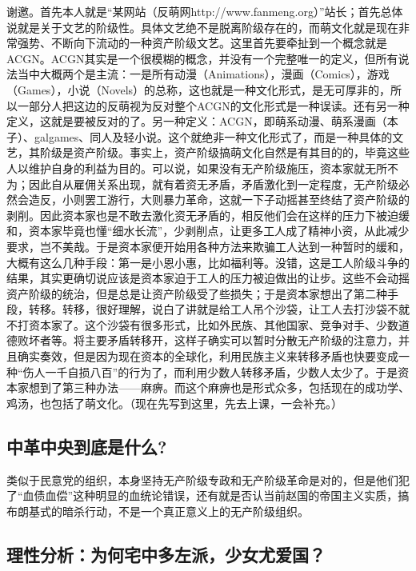 \documentclass{ctexart}
\begin{document}
	谢邀。首先本人就是“某网站（反萌网http://www.fanmeng.org）”站长；首先总体说就是关于文艺的阶级性。具体文艺绝不是脱离阶级存在的，而萌文化就是现在非常强势、不断向下流动的一种资产阶级文艺。这里首先要牵扯到一个概念就是ACGN。ACGN其实是一个很模糊的概念，并没有一个完整唯一的定义，但所有说法当中大概两个是主流：一是所有动漫（Animations），漫画（Comics），游戏（Games），小说（Novels）的总称，这也就是一种文化形式，是无可厚非的，所以一部分人把这边的反萌视为反对整个ACGN的文化形式是一种误读。还有另一种定义，这就是要被反对的了。另一种定义：ACGN，即萌系动漫、萌系漫画（本子）、galgames、同人及轻小说。这个就绝非一种文化形式了，而是一种具体的文艺，其阶级是资产阶级。事实上，资产阶级搞萌文化自然是有其目的的，毕竟这些人以维护自身的利益为目的。可以说，如果没有无产阶级施压，资本家就无所不为；因此自从雇佣关系出现，就有着资无矛盾，矛盾激化到一定程度，无产阶级必然会造反，小则罢工游行，大则暴力革命，这就一下子动摇甚至终结了资产阶级的剥削。因此资本家也是不敢去激化资无矛盾的，相反他们会在这样的压力下被迫缓和，资本家毕竟也懂“细水长流”，少剥削点，让更多工人成了精神小资，从此减少要求，岂不美哉。于是资本家便开始用各种方法来欺骗工人达到一种暂时的缓和，大概有这么几种手段：第一是小恩小惠，比如福利等。没错，这是工人阶级斗争的结果，其实更确切说应该是资本家迫于工人的压力被迫做出的让步。这些不会动摇资产阶级的统治，但是总是让资产阶级受了些损失；于是资本家想出了第二种手段，转移。转移，很好理解，说白了讲就是给工人吊个沙袋，让工人去打沙袋不就不打资本家了。这个沙袋有很多形式，比如外民族、其他国家、竞争对手、少数道德败坏者等。将主要矛盾转移开，这样子确实可以暂时分散无产阶级的注意力，并且确实奏效，但是因为现在资本的全球化，利用民族主义来转移矛盾也快要变成一种“伤人一千自损八百”的行为了，而利用少数人转移矛盾，少数人太少了。于是资本家想到了第三种办法——麻痹。而这个麻痹也是形式众多，包括现在的成功学、鸡汤，也包括了萌文化。（现在先写到这里，先去上课，一会补充。）
	
	\subsection{中革中央到底是什么?}
	
	类似于民意党的组织，本身坚持无产阶级专政和无产阶级革命是对的，但是他们犯了“血债血偿”这种明显的血统论错误，还有就是否认当前赵国的帝国主义实质，搞布朗基式的暗杀行动，不是一个真正意义上的无产阶级组织。
	
	\subsection{理性分析：为何宅中多左派，少女尤爱国？}
	
\end{document}
